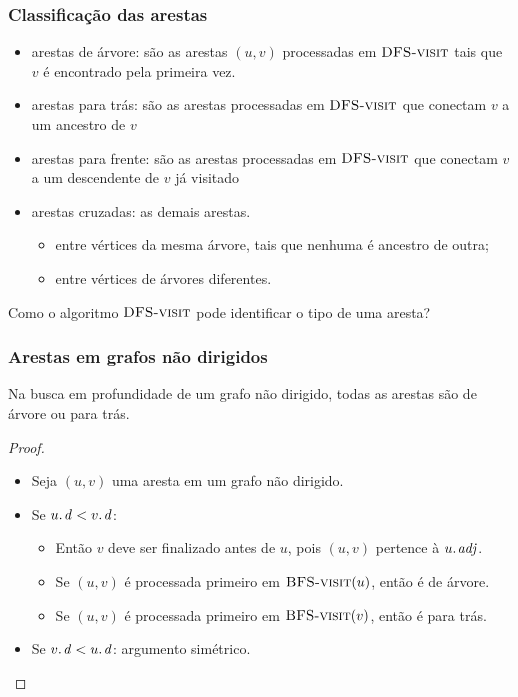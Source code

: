 \documentclass{beamer}
\begin{document}
\begin{frame}
\frametitle{Classificação das arestas}

\begin{itemize}
\item arestas de árvore: são as arestas $(u, v)$ processadas em $\textnormal{\scshape DFS-visit}$ tais que $v$ é encontrado pela primeira vez. 
\item arestas para trás: são as arestas processadas em $\textnormal{\scshape DFS-visit}$ que conectam $v$ a um ancestro de $v$
\item arestas para frente: são as arestas processadas em $\textnormal{\scshape DFS-visit}$ que conectam $v$ a um descendente de $v$ já visitado  
\item arestas cruzadas: as demais arestas.  
\begin{itemize}
\item entre vértices da mesma árvore, tais que nenhuma é ancestro de outra;
\item entre vértices de árvores diferentes.
\end{itemize}
\end{itemize}
\pause
\alert{Como o algoritmo $\textnormal{\scshape DFS-visit}$ pode identificar o tipo de uma aresta?}
\end{frame}

\begin{frame}
\frametitle{Arestas em grafos não dirigidos}

\begin{theorem}
Na busca em profundidade de um grafo não dirigido, todas as arestas são de árvore ou para trás.
\end{theorem}

\begin{proof}
\begin{itemize}
\item Seja $(u, v)$ uma aresta em um grafo não dirigido.
\item Se $\attrib{u}{d} < \attrib{v}{d}$:
\begin{itemize}
\item Então $v$ deve ser finalizado antes de $u$, pois $(u, v)$ pertence à $\attrib{u}{adj}$. 
\item Se $(u, v)$ é processada primeiro em $\textnormal{\scshape BFS-visit}(u)$, então é de árvore.
\item Se $(u, v)$ é processada primeiro em $\textnormal{\scshape BFS-visit}(v)$, então é para trás.
\end{itemize}
\item Se $\attrib{v}{d} < \attrib{u}{d}$: argumento simétrico.
\end{itemize}
\end{proof}

\end{frame}
\end{document}
